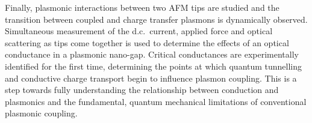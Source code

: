 \documentclass[12pt, a4paper, oneside]{book}
\begin{document}
Finally, plasmonic interactions between two AFM tips are studied and the transition between coupled and charge transfer plasmons is dynamically observed. Simultaneous measurement of the d.c.\ current, applied force and optical scattering as tips come together is used to determine the effects of an optical conductance in a plasmonic nano-gap. Critical conductances are experimentally identified for the first time, determining the points at which quantum tunnelling and conductive charge transport begin to influence plasmon coupling. This is a step towards fully understanding the relationship between conduction and plasmonics and the fundamental, quantum mechanical limitations of conventional plasmonic coupling.
\end{document}
